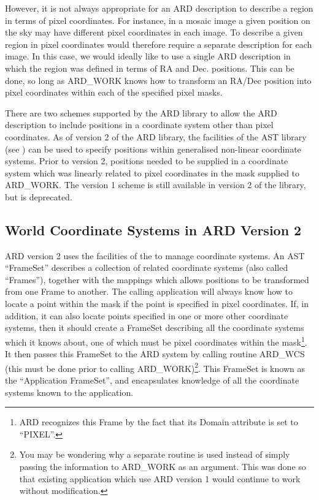 \documentclass[11pt,nolof]{starlink}
\begin{document}
However, it is not always appropriate for an ARD description to describe
a region in terms of pixel coordinates. For instance, in a mosaic image
a given position on the sky may have different pixel coordinates in each
image. To describe a given region in pixel coordinates would therefore
require a separate description for each image. In this case, we would
ideally like to use a single ARD description in which the region was
defined in terms of RA and Dec. positions. This can be done, so long as
ARD\_WORK knows how to transform an RA/Dec position into pixel
coordinates within each of the specified pixel masks.

There are two schemes supported by the ARD library to allow the ARD
description to include positions in a coordinate system other than pixel
coordinates. As of version 2 of the ARD library, the facilities of the
AST library (see ) can be used to specify
positions within generalised non-linear coordinate systems. Prior to
version 2, positions needed to be supplied in a coordinate system which
was linearly related to pixel coordinates in the mask supplied to
ARD\_WORK. The version 1 scheme is still available in version 2 of the
library, but is deprecated.

\subsection{World Coordinate Systems in ARD Version 2}

ARD version 2 uses the facilities of the  to
manage coordinate systems. An AST ``FrameSet'' describes a collection of
related coordinate systems (also called ``Frames''), together with the
mappings which allows positions to be transformed from one Frame to
another. The calling application will always know how to locate a point
within the mask if the point is specified in pixel coordinates. If, in
addition, it can also locate points specified in one or more other
coordinate systems, then it should create a FrameSet describing all the
coordinate systems which it knows about, one of which must be pixel
coordinates within the mask\footnote{ARD recognizes this Frame by the
fact that its Domain attribute is set to ``PIXEL''.}. It then passes this
FrameSet to the ARD system by calling routine ARD\_WCS (this must be done
prior to calling ARD\_WORK)\footnote{You may be wondering why a separate
routine is used instead of simply passing the information to ARD\_WORK as
an argument. This was done so that existing application which use ARD
version 1 would continue to work without modification.}. This FrameSet is
known as the ``Application FrameSet'', and encapsulates knowledge of all
the coordinate systems known to the application.
\end{document}
